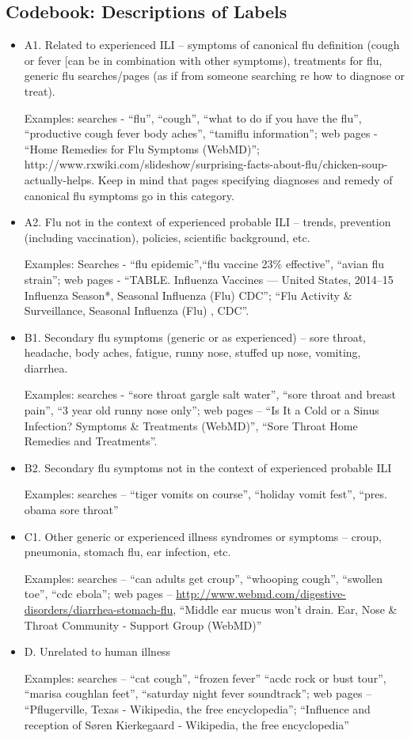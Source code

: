 \documentclass[12pt]{article}
\begin{document}
\subsection{Codebook: Descriptions of Labels}
\begin{itemize}
\item A1. Related to experienced ILI – symptoms of canonical flu definition (cough or fever [can be in combination with other symptoms), treatments for flu, generic flu searches/pages (as if from someone searching re how to diagnose or treat).

Examples: searches - “flu”, “cough”, “what to do if you have the flu”, “productive cough fever body aches”, “tamiflu information”; web pages - “Home Remedies for Flu Symptoms (WebMD)”; http://www.rxwiki.com/slideshow/surprising-facts-about-flu/chicken-soup-actually-helps. 
Keep in mind that pages specifying diagnoses and remedy of canonical flu symptoms go in this category.

\item A2. Flu not in the context of experienced probable ILI – trends, prevention (including vaccination), policies, scientific background, etc.

Examples: Searches - ``flu epidemic'',``flu vaccine 23\% effective'', ``avian flu strain''; web pages - ``TABLE. Influenza Vaccines — United States, 2014–15 Influenza Season*,  Seasonal Influenza (Flu)  CDC”; ``Flu Activity \& Surveillance, Seasonal Influenza (Flu) , CDC''.

\item B1. Secondary flu symptoms (generic or as experienced) – sore throat, headache, body aches, fatigue, runny nose, stuffed up nose, vomiting, diarrhea.

Examples: searches - ``sore throat gargle salt water'', ``sore throat and breast pain'', ``3 year old runny nose only''; web pages – ``Is It a Cold or a Sinus Infection? Symptoms \& Treatments (WebMD)'', ``Sore Throat Home Remedies and Treatments''.

\item B2. Secondary flu symptoms not in the context of experienced probable ILI 

Examples: searches – “tiger vomits on course”, “holiday vomit fest”, “pres. obama sore throat”

 \item C1. Other generic or experienced illness syndromes or symptoms – croup, pneumonia, stomach flu, ear infection, etc.

Examples: searches – ``can adults get croup'', ``whooping cough'', ``swollen toe'', ``cdc ebola''; web pages – \url{http://www.webmd.com/digestive-disorders/diarrhea-stomach-flu}, ``Middle ear mucus won't drain. Ear, Nose \& Throat Community - Support Group (WebMD)''

\item D. Unrelated to human illness 

Examples: searches – “cat cough”, “frozen fever” “acdc rock or bust tour”, “marisa coughlan feet”, “saturday night fever soundtrack”; web pages – “Pflugerville, Texas - Wikipedia, the free encyclopedia”; “Influence and reception of Søren Kierkegaard - Wikipedia, the free encyclopedia”
\end{itemize}
\end{document}
